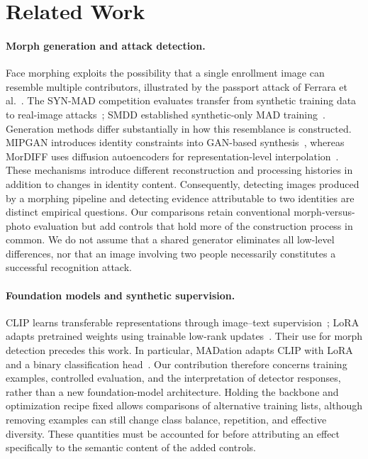\section{Related Work}
\label{sec:related}

\paragraph{Morph generation and attack detection.}
Face morphing exploits the possibility that a single enrollment image can resemble multiple contributors, illustrated by the passport attack of Ferrara et al.~\cite{ferrara2014magic}. The SYN-MAD competition evaluates transfer from synthetic training data to real-image attacks~\cite{huber2022synmad}; SMDD established synthetic-only MAD training~\cite{damer2022smdd}. Generation methods differ substantially in how this resemblance is constructed. MIPGAN introduces identity constraints into GAN-based synthesis~\cite{zhang2021mipgan}, whereas MorDIFF uses diffusion autoencoders for representation-level interpolation~\cite{damer2023mordiff}. These mechanisms introduce different reconstruction and processing histories in addition to changes in identity content. Consequently, detecting images produced by a morphing pipeline and detecting evidence attributable to two identities are distinct empirical questions. Our comparisons retain conventional morph-versus-photo evaluation but add controls that hold more of the construction process in common. We do not assume that a shared generator eliminates all low-level differences, nor that an image involving two people necessarily constitutes a successful recognition attack.

\paragraph{Foundation models and synthetic supervision.}
CLIP learns transferable representations through image--text supervision~\cite{radford2021clip}; LoRA adapts pretrained weights using trainable low-rank updates~\cite{hu2022lora}. Their use for morph detection precedes this work. In particular, MADation adapts CLIP with LoRA and a binary classification head~\cite{caldeira2025madation}. Our contribution therefore concerns training examples, controlled evaluation, and the interpretation of detector responses, rather than a new foundation-model architecture. Holding the backbone and optimization recipe fixed allows comparisons of alternative training lists, although removing examples can still change class balance, repetition, and effective diversity. These quantities must be accounted for before attributing an effect specifically to the semantic content of the added controls.

